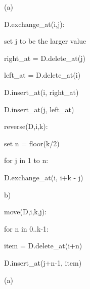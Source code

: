 \documentclass[12pt]{article}
\theoremstyle{plain}
\newenvironment{problem}[2][Problem]{\begin{trivlist}
		\item[\hskip \labelsep {\bfseries #1}\hskip \labelsep {\bfseries #2.}]}{\end{trivlist}}
\theoremstyle{remark}
\theoremstyle{plain}
\theoremstyle{definition}
\theoremstyle{remark}
\begin{document}
	
	\begin{problem} {1-2}
		
			(a)
			
			D.exchange\_at(i,j):
			
			\quad set j to be the larger value
			
			\quad right\_at = D.delete\_at(j)
			
			\quad left\_at = D.delete\_at(i)
			
			\quad D.insert\_at(i, right\_at)
			
			\quad D.insert\_at(j, left\_at)
			
			reverse(D,i,k):
			
			\quad set n = floor(k/2)
			
			\quad for j in 1 to n:
			
			\quad D.exchange\_at(i, i+k - j)
			
			b)
			
			move(D,i,k,j):
			
			\quad for n in 0..k-1:
			
			\quad \quad item = D.delete\_at(i+n)
			
		\quad	\quad D.insert\_at(j+n-1, item)
	\end{problem}
	\begin{problem}{1-4}		(a)
	\end{problem}
	
	
	
\end{document}

